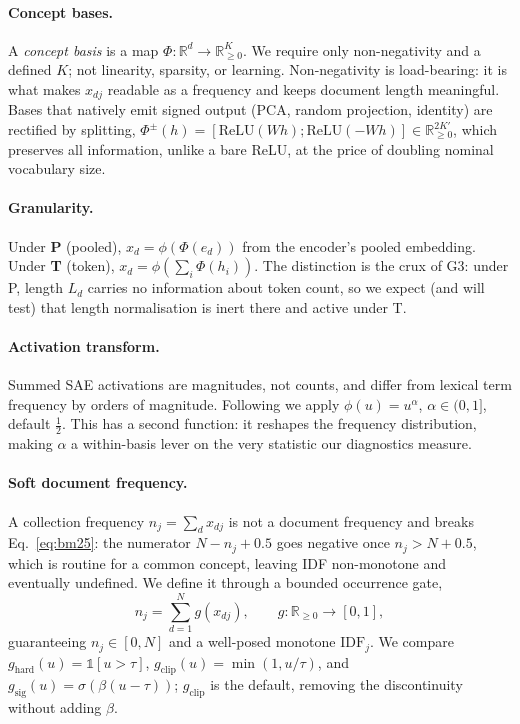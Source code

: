 \documentclass[11pt]{article}
\newcommand{\idf}{\mathrm{IDF}}
\begin{document}
\paragraph{Concept bases.} A \emph{concept basis} is a map $\Phi:\mathbb{R}^d\!\to\!\mathbb{R}^K_{\geq0}$. We require only non-negativity and a defined $K$; not linearity, sparsity, or learning. Non-negativity is load-bearing: it is what makes $x_{dj}$ readable as a frequency and keeps document length meaningful. Bases that natively emit signed output (PCA, random projection, identity) are rectified by splitting,
$\Phi^{\pm}(h)=[\mathrm{ReLU}(Wh);\mathrm{ReLU}(-Wh)]\in\mathbb{R}^{2K'}_{\geq0}$,
which preserves all information, unlike a bare ReLU, at the price of doubling nominal vocabulary size.

\paragraph{Granularity.} Under \textbf{P} (pooled), $x_d=\phi(\Phi(e_d))$ from the encoder's pooled embedding. Under \textbf{T} (token), $x_d=\phi(\sum_i \Phi(h_i))$. The distinction is the crux of G3: under P, length $L_d$ carries no information about token count, so we expect (and will test) that length normalisation is inert there and active under T.

\paragraph{Activation transform.} Summed SAE activations are magnitudes, not counts, and differ from lexical term frequency by orders of magnitude. Following \citet{clavie2026latent} we apply $\phi(u)=u^{\alpha}$, $\alpha\in(0,1]$, default $\tfrac12$. This has a second function: it reshapes the frequency distribution, making $\alpha$ a within-basis lever on the very statistic our diagnostics measure.

\paragraph{Soft document frequency.} A collection frequency $n_j=\sum_d x_{dj}$ is not a document frequency and breaks Eq.~\ref{eq:bm25}: the numerator $N-n_j+0.5$ goes negative once $n_j>N+0.5$, which is routine for a common concept, leaving IDF non-monotone and eventually undefined. We define it through a bounded occurrence gate,
\begin{equation}
n_j=\sum_{d=1}^{N} g(x_{dj}),\qquad g:\mathbb{R}_{\geq0}\!\to\![0,1],
\end{equation}
guaranteeing $n_j\in[0,N]$ and a well-posed monotone $\idf_j$. We compare $g_{\text{hard}}(u)=\mathbb{1}[u>\tau]$, $g_{\text{clip}}(u)=\min(1,u/\tau)$, and $g_{\text{sig}}(u)=\sigma(\beta(u-\tau))$; $g_{\text{clip}}$ is the default, removing the discontinuity without adding $\beta$.
\end{document}
